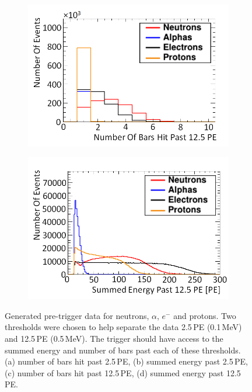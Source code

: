 \begin{figure}[!h]
\begin{subfigure}{.49\textwidth}
  \includegraphics[width=\linewidth]{Chapter4.5/Figs/preTrigNba12.5.png}
  \captionsetup{width=.9\linewidth}
  \caption{}
  \label{subFig:preTrigNba12.5}
\end{subfigure}
\begin{subfigure}{.49\textwidth}
  \centering
  \includegraphics[width=\linewidth]{Chapter4.5/Figs/preTrigSea12.5.png}
  \captionsetup{width=.9\linewidth}
  \caption{}
  \label{subFig:preTrigSea12.5}
\end{subfigure}
\caption{Generated pre-trigger data for neutrons, $\alpha$, $e^-$ and protons. Two thresholds were chosen to help separate the data 2.5\,PE (0.1\,MeV) and 12.5\,PE (0.5\,MeV). The trigger should have access to the summed energy and number of bars past each of these thresholds. (a) number of bars hit past 2.5\,PE, (b) summed energy past 2.5\,PE, (c) number of bars hit past 12.5\,PE, (d) summed energy past 12.5\,PE.}
\label{fig:preTriggerData}
\end{figure}

